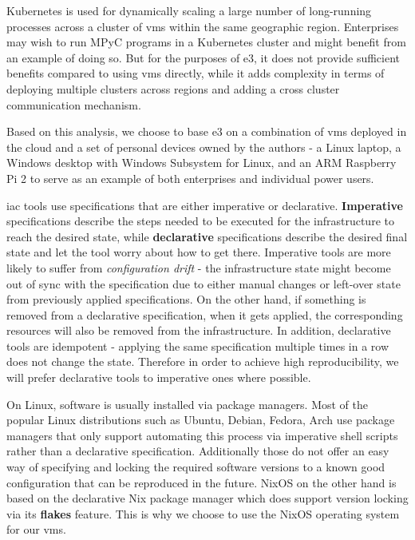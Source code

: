 \documentclass[
]{article}
\begin{document}
Kubernetes is used for dynamically scaling a large number of
long-running processes across a cluster of \glspl{vm} within the same
geographic region. Enterprises may wish to run MPyC programs in a
Kubernetes cluster and might benefit from an example of doing so. But
for the purposes of \gls{e3}, it does not provide sufficient benefits
compared to using \glspl{vm} directly, while it adds complexity in terms
of deploying multiple clusters across regions and adding a cross cluster
communication mechanism.

Based on this analysis, we choose to base \gls{e3} on a combination of
\glspl{vm} deployed in the cloud and a set of personal devices owned by
the authors - a Linux laptop, a Windows desktop with Windows Subsystem
for Linux, and an ARM Raspberry Pi 2 to serve as an example of both
enterprises and individual power users.

\gls{iac} tools use specifications that are either imperative or
declarative. \textbf{Imperative} specifications describe the steps
needed to be executed for the infrastructure to reach the desired state,
while \textbf{declarative} specifications describe the desired final
state and let the tool worry about how to get there. Imperative tools
are more likely to suffer from \emph{configuration drift} - the
infrastructure state might become out of sync with the specification due
to either manual changes or left-over state from previously applied
specifications. On the other hand, if something is removed from a
declarative specification, when it gets applied, the corresponding
resources will also be removed from the infrastructure. In addition,
declarative tools are idempotent - applying the same specification
multiple times in a row does not change the state. Therefore in order to
achieve high reproducibility, we will prefer declarative tools to
imperative ones where possible.

On Linux, software is usually installed via package managers. Most of
the popular Linux distributions such as Ubuntu, Debian, Fedora, Arch use
package managers that only support automating this process via
imperative shell scripts rather than a declarative specification.
Additionally those do not offer an easy way of specifying and locking
the required software versions to a known good configuration that can be
reproduced in the future. NixOS on the other hand is based on the
declarative Nix package manager which does support version locking via
its \textbf{flakes} feature. This is why we choose to use the NixOS
operating system for our \glspl{vm}.
\end{document}
